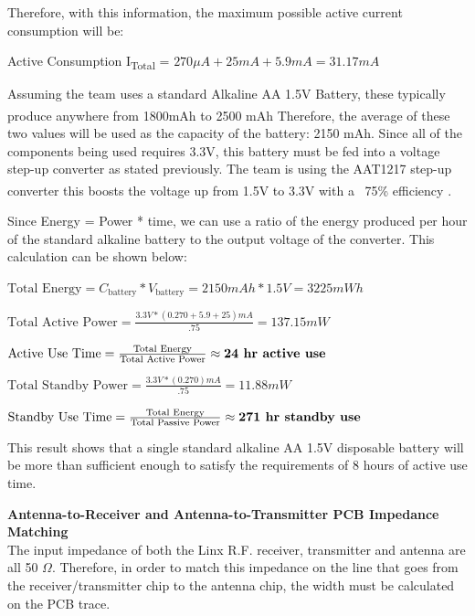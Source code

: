 \documentclass[letterpaper,10pt]{article}
\begin{document}
\begin{spacing}{1.15}
Therefore, with this information, the maximum possible active current consumption will be:
\begin{center}{Active Consumption I\textsubscript{Total} = $270 \mu A + 25 mA + 5.9 mA = 31.17 mA $}\end{center}

Assuming the team uses a standard Alkaline AA 1.5V Battery, these typically produce anywhere from 1800mAh to 2500 mAh \textsuperscript{\cite{Battery}} Therefore, the average of these two values will be used as the capacity of the battery: 2150 mAh. Since all of the components being used requires 3.3V, this battery must be fed into a voltage step-up converter as stated previously. The team is using the AAT1217 step-up converter this boosts the voltage up from 1.5V to 3.3V with a ~75\% efficiency \textsuperscript{\cite{AAT1217}}.

Since Energy = Power * time, we can use a ratio of the energy produced per hour of the standard alkaline battery to the output voltage of the converter. This calculation can be shown below:



\begin{center} 
	$\textrm{Total Energy} = C_\textrm{battery} * V_\textrm{battery} = 2150 mAh * 1.5V = 3225 mWh$
	
	$\textrm{Total Active Power} = \frac{3.3 V * (0.270 + 5.9 + 25) mA}{.75} = 137.15mW$ 
	
	$\textrm{Active Use Time} = \frac{\textrm{Total Energy}}{\textrm{Total Active Power}} \approx \textrm{\textbf{24 hr active use}}$
	
	$\textrm{Total Standby Power} = \frac{3.3 V * (0.270) mA}{.75} = 11.88 mW$
	
	$\textrm{Standby Use Time} = \frac{\textrm{Total Energy}}{\textrm{Total Passive Power}} \approx \textrm{\textbf{271 hr  standby use}}$
\end{center}

This result shows that a single standard alkaline AA 1.5V disposable battery will be more than sufficient enough to satisfy the requirements of 8 hours of active use time.

\normalsize\textbf{Antenna-to-Receiver and Antenna-to-Transmitter PCB Impedance Matching} \\
The input impedance of both the Linx R.F. receiver, transmitter and antenna are all 50 $\Omega$. Therefore, in order to match this impedance on the line that goes from the receiver/transmitter chip to the antenna chip, the width must be calculated on the PCB trace. 


\end{spacing}
\end{document}
